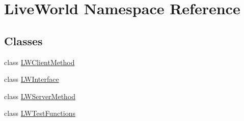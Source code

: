 \hypertarget{namespace_live_world}{}\section{Live\+World Namespace Reference}
\label{namespace_live_world}
\subsection*{Classes}
\begin{DoxyCompactItemize}
\item 
class \hyperlink{class_live_world_1_1_l_w_client_method}{L\+W\+Client\+Method}
\item 
class \hyperlink{class_live_world_1_1_l_w_interface}{L\+W\+Interface}
\item 
class \hyperlink{class_live_world_1_1_l_w_server_method}{L\+W\+Server\+Method}
\item 
class \hyperlink{class_live_world_1_1_l_w_test_functions}{L\+W\+Test\+Functions}
\end{DoxyCompactItemize}

